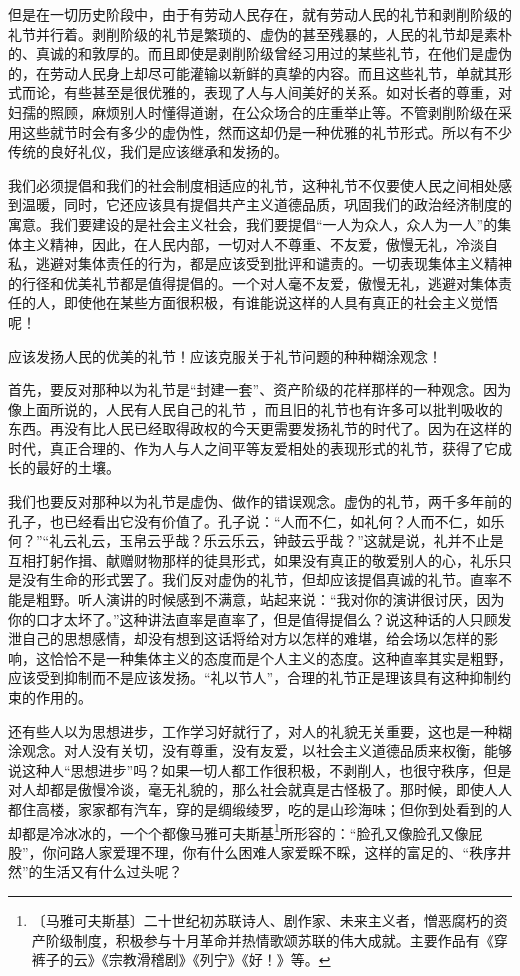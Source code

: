 \documentclass[12pt,UTF-8,openany]{ctexbook}
\begin{document}
\begin{normalsize}
    但是在一切历史阶段中，由于有劳动人民存在，就有劳动人民的礼节和剥削阶级的礼节并行着。剥削阶级的礼节是繁琐的、虚伪的甚至残暴的，人民的礼节却是素朴的、真诚的和敦厚的。而且即使是剥削阶级曾经习用过的某些礼节，在他们是虚伪的，在劳动人民身上却尽可能灌输以新鲜的真挚的内容。而且这些礼节，单就其形式而论，有些甚至是很优雅的，表现了人与人间美好的关系。如对长者的尊重，对妇孺的照顾，麻烦别人时懂得道谢，在公众场合的庄重举止等。不管剥削阶级在采用这些就节时会有多少的虚伪性，然而这却仍是一种优雅的礼节形式。所以有不少传统的良好礼仪，我们是应该继承和发扬的。
    
    我们必须提倡和我们的社会制度相适应的礼节，这种礼节不仅要使人民之间相处感到温暖，同时，它还应该具有提倡共产主义道德品质，巩固我们的政治经济制度的寓意。我们要建设的是社会主义社会，我们要提倡“一人为众人，众人为一人”的集体主义精神，因此，在人民内部，一切对人不尊重、不友爱，傲慢无礼，冷淡自私，逃避对集体责任的行为，都是应该受到批评和谴责的。一切表现集体主义精神的行径和优美礼节都是值得提倡的。一个对人毫不友爱，傲慢无礼，逃避对集体责任的人，即使他在某些方面很积极，有谁能说这样的人具有真正的社会主义觉悟呢！
    
    应该发扬人民的优美的礼节！应该克服关于礼节问题的种种糊涂观念！
    
    首先，要反对那种以为礼节是“封建一套”、资产阶级的花样那样的一种观念。因为像上面所说的，人民有人民自己的礼节 ，而且旧的礼节也有许多可以批判吸收的东西。再没有比人民已经取得政权的今天更需要发扬礼节的时代了。因为在这样的时代，真正合理的、作为人与人之间平等友爱相处的表现形式的礼节，获得了它成长的最好的土壤。
    
    我们也要反对那种以为礼节是虚伪、做作的错误观念。虚伪的礼节，两千多年前的孔子，也已经看出它没有价值了。孔子说：“人而不仁，如礼何？人而不仁，如乐何？”“礼云礼云，玉帛云乎哉？乐云乐云，钟鼓云乎哉？”这就是说，礼并不止是互相打躬作揖、献赠财物那样的徒具形式，如果没有真正的敬爱别人的心，礼乐只是没有生命的形式罢了。我们反对虚伪的礼节，但却应该提倡真诚的礼节。直率不能是粗野。听人演讲的时候感到不满意，站起来说：“我对你的演讲很讨厌，因为你的口才太坏了。”这种讲法直率是直率了，但是值得提倡么？说这种话的人只顾发泄自己的思想感情，却没有想到这话将给对方以怎样的难堪，给会场以怎样的影响，这恰恰不是一种集体主义的态度而是个人主义的态度。这种直率其实是粗野，应该受到抑制而不是应该发扬。“礼以节人”，合理的礼节正是理该具有这种抑制约束的作用的。
    
    还有些人以为思想进步，工作学习好就行了，对人的礼貌无关重要，这也是一种糊涂观念。对人没有关切，没有尊重，没有友爱，以社会主义道德品质来权衡，能够说这种人“思想进步”吗？如果一切人都工作很积极，不剥削人，也很守秩序，但是对人却都是傲慢冷谈，毫无礼貌的，那么社会就真是古怪极了。那时候，即使人人都住高楼，家家都有汽车，穿的是绸缎绫罗，吃的是山珍海味；但你到处看到的人却都是冷冰冰的，一个个都像马雅可夫斯基\footnote{〔马雅可夫斯基〕二十世纪初苏联诗人、剧作家、未来主义者，憎恶腐朽的资产阶级制度，积极参与十月革命并热情歌颂苏联的伟大成就。主要作品有《穿裤子的云》《宗教滑稽剧》《列宁》《好！》等。}所形容的：“脸孔又像脸孔又像屁股”，你问路人家爱理不理，你有什么困难人家爱睬不睬，这样的富足的、“秩序井然”的生活又有什么过头呢？
    

\end{normalsize}
\end{document}
